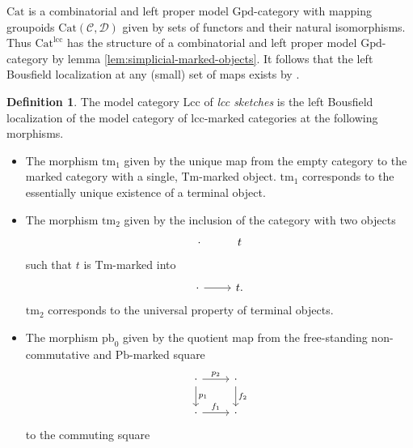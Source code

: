 \documentclass[a4paper]{article}
\theoremstyle{remark}
\theoremstyle{definition}
\newtheorem{definition}[theorem]{Definition}
\begin{document}
$\mathrm{Cat}$ is a combinatorial and left proper model $\mathrm{Gpd}$-category with mapping groupoids $\mathrm{Cat}(\mathcal{C}, \mathcal{D})$ given by sets of functors and their natural isomorphisms.
Thus $\mathrm{Cat}^{\mathrm{lcc}}$ has the structure of a combinatorial and left proper model $\mathrm{Gpd}$-category by lemma \ref{lem:simplicial-marked-objects}.
It follows that the left Bousfield localization at any (small) set of maps exists by \citet[Theorem 4.1.1]{hirschhorn}.

\begin{definition}
  \label{def:lcc-axioms}
  The model category $\mathrm{Lcc}$ of \emph{lcc sketches} is the left Bousfield localization of the model category of $\mathrm{lcc}$-marked categories at the following morphisms.
  \begin{itemize}
    \item
      The morphism $\mathrm{tm}_1$ given by the unique map from the empty category to the marked category with a single, $\mathrm{Tm}$-marked object.
      $\mathrm{tm}_1$ corresponds to the essentially unique existence of a terminal object.
    \item
      The morphism $\mathrm{tm}_2$ given by the inclusion of the category with two objects
      \begin{equation}
        \begin{tikzcd}
          \cdot & t
        \end{tikzcd}
      \end{equation}
      such that $t$ is $\mathrm{Tm}$-marked into
      \begin{equation}
          \begin{tikzcd}
            \cdot \arrow[r] & t.
          \end{tikzcd}
      \end{equation}
      $\mathrm{tm}_2$ corresponds to the universal property of terminal objects.
    \item
      \label{itm:pbs-commute}
      The morphism $\mathrm{pb}_0$ given by the quotient map from the free-standing non-commutative and $\mathrm{Pb}$-marked square
      \begin{equation}
        \begin{tikzcd}
          \cdot \arrow[r, "p_2"] \arrow[d, "p_1"] & \cdot \arrow[d, "f_2"] \\
          \cdot \arrow[r, "f_1"] & \cdot
        \end{tikzcd}
      \end{equation}
      to the commuting square

\end{itemize}
\end{definition}
\end{document}
